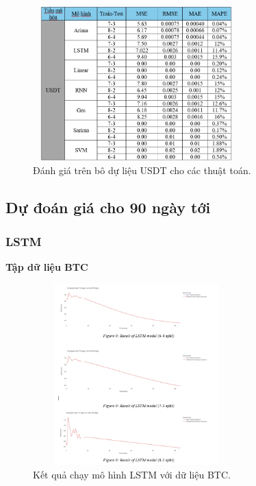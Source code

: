 \documentclass[conference]{IEEEtran}
\begin{document}
\begin{figure}[H] %
    \centering
    \includegraphics[width=8cm, height=6cm]{Images/Chỉ số đo USDT.png} %
    \caption{Đánh giá trên bô dự liệu USDT cho các thuật toán.}
    \label{fig:arima-model}
\end{figure}

\subsection{Dự đoán giá cho 90 ngày tới }
\subsubsection{LSTM} \textbf{Tập dữ liệu BTC}
\begin{figure}[H] %
    \centering
    \includegraphics[width=8cm, height=7cm]{Images/LSTM-BTC.png} %
    \caption{Kết quả chạy mô hình LSTM với dữ liệu BTC.}
    \label{fig:arima-model}
\end{figure}
\end{document}
